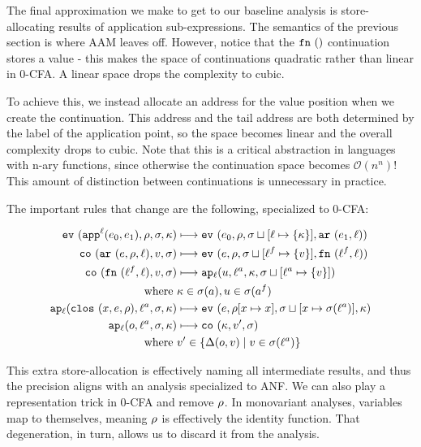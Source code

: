 \documentclass[preprint,onecolumn,9pt]{sigplanconf} %
\begin{document}
The final approximation we make to get to our baseline analysis is
store-allocating results of application sub-expressions. The semantics
of the previous section is where AAM leaves off. However, notice that
the ${\tt fn{\ }}({})$ continuation stores a value - this makes the space of
continuations quadratic rather than linear in 0-CFA. A linear space
drops the complexity to cubic.

To achieve this, we instead allocate an address for the value position
when we create the continuation.  This address and the tail address
are both determined by the label of the application point, so the
space becomes linear and the overall complexity drops to cubic. Note
that this is a critical abstraction in languages with n-ary functions,
since otherwise the continuation space becomes ${\mathcal O}(n^n)$!
This amount of distinction between continuations is unnecessary
in practice.

The important rules that change are the following, specialized to 0-CFA:

\newcommand{\ext}[3]{#1\sqcup[#2\mapsto#3]}

\begin{align*}
\ev{\sapp[^\mlab]{\mexpi0}{\mexpi1},\menv,\msto,\mkont} &\machstep
\ev{\mexpi{0},\menv,\ext{\msto}{\mlab}{\{\mkont\}},\kar{\mexpi{1},\mlab}}
\\
\co{\kar{\mexp,\menv,\mlab},\mval,\msto} & \machstep
\ev{\mexp,\menv,\ext{\msto}{\mlab^f}{\{\mval\}},\kfn{\mlab^f,\mlab}}
\\
\co{\kfn{\mlab^f,\mlab},\mval,\msto} & \machstep
\ap[_\mlab]{\mvalx{u},\mlab^a,\mkont,\ext{\msto}{\mlab^a}{\{\mval\}}}
\\
\text{ where } &\mkont \in \msto(\maddr), \mvalx{u} \in \msto(\maddr^f)
\\
\ap[_\mlab]{\clos{\mvar,\mexp,\menv},\mlab^a, \msto,\mkont} & \machstep
\ev{\mexp,\menv[\mvar\mapsto\mvar],\ext{\msto}{\mvar}{\msto(\mlab^a)},\mkont}
\\
\ap[_\mlab]{\mop,\mlab^a,\msto,\mkont} & \machstep
\co{\mkont,\mval',\msto}
\\
\text{ where }& \mval'\in \{\interpdelta(\mop,\mval) \mid \mval \in \msto(\mlab^a)\}
\end{align*}

This extra store-allocation is effectively naming all intermediate
results, and thus the precision aligns with an analysis specialized to
ANF. We can also play a representation trick in 0-CFA and remove
$\rho$. In monovariant analyses, variables map to themselves, meaning
$\rho$ is effectively the identity function. That degeneration, in
turn, allows us to discard it from the analysis.
\end{document}
